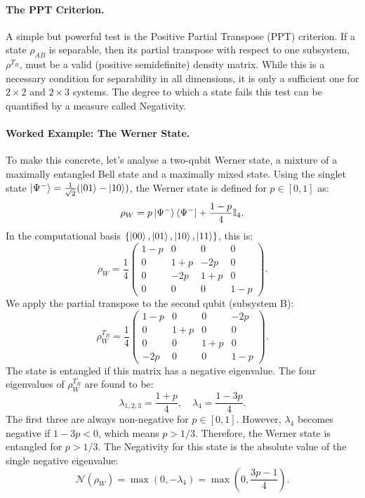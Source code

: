 \paragraph{The PPT Criterion.}
A simple but powerful test is the Positive Partial Transpose (PPT)
criterion. If a state $\rho_{AB}$ is separable, then its partial transpose
with respect to one subsystem, $\rho^{T_B}$, must be a valid (positive
semidefinite) density matrix. While this is a necessary condition for
separability in all dimensions, it is only a sufficient one for
$2 \times 2$ and $2 \times 3$ systems. The degree to which a state fails
this test can be quantified by a measure called Negativity.

\paragraph{Worked Example: The Werner State.}
To make this concrete, let's analyse a two-qubit Werner state, a mixture
of a maximally entangled Bell state and a maximally mixed state. Using the
singlet state $\ket{\Psi^-} = \frac{1}{\sqrt{2}}(\ket{01}-\ket{10})$, the
Werner state is defined for $p \in [0, 1]$ as:
\begin{equation}
	\rho_W = p \ket{\Psi^-}\bra{\Psi^-} + \frac{1-p}{4} \mathbb{I}_4.
\end{equation}
In the computational basis $\{\ket{00}, \ket{01}, \ket{10}, \ket{11}\}$, this is:
\begin{equation}
	\rho_W = \frac{1}{4}
	\begin{pmatrix}
		1-p & 0 & 0 & 0 \\
		0 & 1+p & -2p & 0 \\
		0 & -2p & 1+p & 0 \\
		0 & 0 & 0 & 1-p
	\end{pmatrix}.
\end{equation}
We apply the partial transpose to the second qubit (subsystem B):
\begin{equation}
	\rho_W^{T_B} = \frac{1}{4}
	\begin{pmatrix}
		1-p & 0 & 0 & -2p \\
		0 & 1+p & 0 & 0 \\
		0 & 0 & 1+p & 0 \\
		-2p & 0 & 0 & 1-p
	\end{pmatrix}.
\end{equation}
The state is entangled if this matrix has a negative eigenvalue. The four
eigenvalues of $\rho_W^{T_B}$ are found to be:
\begin{equation}
	\lambda_{1,2,3} = \frac{1+p}{4}, \quad \lambda_4 = \frac{1-3p}{4}.
\end{equation}
The first three are always non-negative for $p \in [0,1]$. However,
$\lambda_4$ becomes negative if $1-3p < 0$, which means $p > 1/3$.
Therefore, the Werner state is entangled for $p > 1/3$. The Negativity for
this state is the absolute value of the single negative eigenvalue:
\begin{equation}
	\mathcal{N}(\rho_W) = \max\left(0, -\lambda_4\right) = \max\left(0, \frac{3p-1}{4}\right).
\end{equation}

